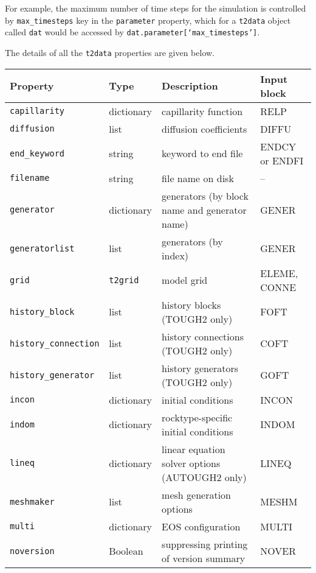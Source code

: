 For example, the maximum number of time steps for the simulation is controlled by \texttt{max\_timesteps} key in the \texttt{parameter} property, which for a \texttt{t2data} object called \texttt{dat} would be accessed by \texttt{dat.parameter[`max\_timesteps']}.

The details of all the \texttt{t2data} properties are given below.

\begin{sidewaystable}
  \begin{center}
    \begin{tabular}{|l|l|l|l|}
      \hline
      \textbf{Property} & \textbf{Type} & \textbf{Description} & \textbf{Input block}\\
      \hline
      \texttt{capillarity} & dictionary & capillarity function & RELP\\
      \texttt{diffusion} & list & diffusion coefficients & DIFFU\\
      \texttt{end\_keyword} & string & keyword to end file & ENDCY or ENDFI\\
      \texttt{filename} & string & file name on disk & --\\
      \texttt{generator} & dictionary & generators (by block name and generator name) & GENER\\
      \texttt{generatorlist} & list & generators (by index) & GENER\\
      \texttt{grid} & \texttt{t2grid} & model grid & ELEME, CONNE\\
      \texttt{history\_block} & list & history blocks (TOUGH2 only) & FOFT\\
      \texttt{history\_connection} & list & history connections (TOUGH2 only) & COFT\\
      \texttt{history\_generator} & list & history generators (TOUGH2 only) & GOFT\\
      \texttt{incon} & dictionary & initial conditions & INCON\\
      \texttt{indom} & dictionary & rocktype-specific initial conditions & INDOM\\
      \texttt{lineq} & dictionary & linear equation solver options (AUTOUGH2 only) & LINEQ\\
      \texttt{meshmaker} & list & mesh generation options & MESHM\\
      \texttt{multi} & dictionary & EOS configuration & MULTI\\
      \texttt{noversion} & Boolean & suppressing printing of version summary & NOVER\\

\end{tabular}
\end{center}
\end{sidewaystable}
